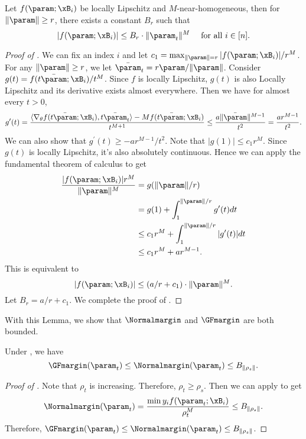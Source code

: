 \begin{lemma}
\label{lem:near-homogeneity}
Let $f(\param;\xB_i)$ be locally Lipschitz and $M$-near-homogeneous, then for $\|\param\|\ge r$, there exists a constant $B_r$ such that 
\[
    |f(\param; \xB_i)| \le B_r \cdot \|\param_t\|^M \quad \text{ for all } i \in [n].
\]
\end{lemma}
\begin{proof}[Proof of ]
We can fix an index $i$ and let $c_1 = \max_{\|\param\|= r} |f(\param; \xB_i)|/r^M$. For any $\|\param\|\ge r$, we let $\bar \param_t= r \param/\|\param\|$. Consider  $g(t) = f(t \bar \param; \xB_i)/t^M$. Since $f$ is locally Lipschitz, $ g(t)$ is also Locally Lipschitz and its derivative exists almost everywhere. Then we have for almost every $t>0$,
\[
    g^\prime (t) = \frac{\langle \nabla_{\theta}f(t\bar \param;\xB_i) , t\bar \param_t\rangle - M f(t\bar \param; \xB_i) }{t^{M+1}} \le \frac{a \|\bar \param\|^{M-1}}{t^2} = \frac{ar^{M-1}}{t^2}.  
\]
We can also show that $g^\prime (t) \ge -ar^{M-1}/t^2$. Note that $|g(1)|\le c_1r^M$.  Since $g(t)$ is locally Lipschitz, it's also absolutely continuous. Hence we can apply the fundamental theorem of calculus to get
\begin{align*}
\frac{|f(\param; \xB_i)|r^M}{\|\param\|^M} 
&=  g(\|\param\|/r) \\
& = g(1) + \int_1^{\|\param\|/r} g^\prime (t) dt \\ 
&\le c_1r^M + \int_1^{\|\param\|/r} |g^\prime (t)| dt  \\ 
&\le  c_1 r^M + ar^{M-1}.
\end{align*}
This is equivalent to 
\[
    |f(\param; \xB_i)| \le ( a/r + c_1) \cdot \|\param\|^M.
\]
Let $B_r = a/r + c_1$. We complete the proof of . 
\end{proof}

With this Lemma, we show that $\Normalmargin$ and $\GFmargin$ are both bounded. 

\begin{lemma}
    \label{lem:margin-bounded}
    Under , we have
    \[
    \GFmargin(\param_t) \le \Normalmargin(\param_t)\le B_{\|\rho_s\|}. 
    \] 
\end{lemma}
\begin{proof}[Proof of ]
    Note that $\rho_t$ is increasing. Therefore, $\rho_t \ge \rho_s$. Then we can apply  to get 
    \[
        \Normalmargin(\param_t) = \frac{\min y_i f(\param_t;\xB_i)}{\rho_t^M} \le B_{\|\rho_s\|} . 
    \]
    Therefore, $\GFmargin(\param_t) \le \Normalmargin(\param_t)\le B_{\|\rho_s\|}$.
\end{proof}


